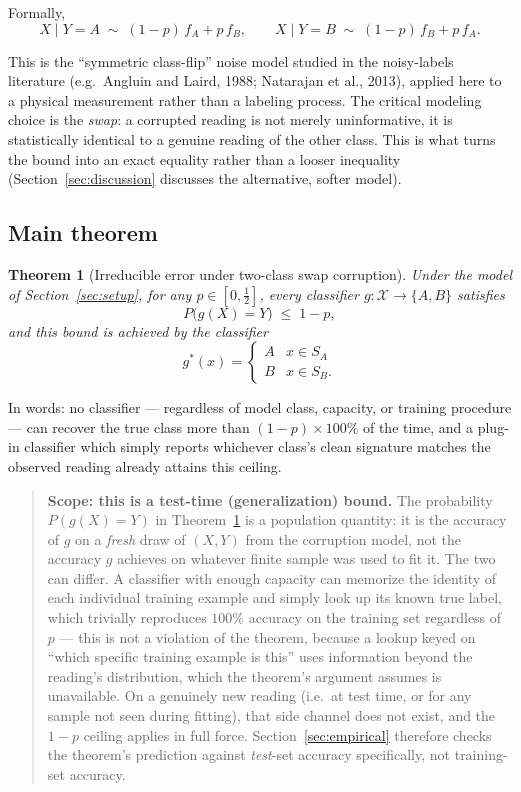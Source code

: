 \documentclass[11pt]{article}
\newtheorem{theorem}{Theorem}
\begin{document}
Formally,
\[
  X \mid Y = A \;\sim\; (1-p)\,f_A + p\,f_B,
  \qquad
  X \mid Y = B \;\sim\; (1-p)\,f_B + p\,f_A.
\]

This is the ``symmetric class-flip'' noise model studied in the
noisy-labels literature (e.g.\ Angluin and Laird, 1988; Natarajan et al.,
2013), applied here to a physical measurement rather than a labeling
process. The critical modeling choice is the \emph{swap}: a corrupted
reading is not merely uninformative, it is statistically identical to a
genuine reading of the other class. This is what turns the bound into an
exact equality rather than a looser inequality (Section~\ref{sec:discussion}
discusses the alternative, softer model).

\subsection{Main theorem}

\begin{theorem}[Irreducible error under two-class swap corruption]
\label{thm:main}
Under the model of Section~\ref{sec:setup}, for any $p \in [0, \tfrac12]$,
every classifier $g : \mathcal{X} \to \{A, B\}$ satisfies
\[
  P\big(g(X) = Y\big) \;\le\; 1 - p,
\]
and this bound is achieved by the classifier
\[
  g^\ast(x) = \begin{cases} A & x \in S_A \\ B & x \in S_B. \end{cases}
\]
\end{theorem}

In words: no classifier --- regardless of model class, capacity, or training
procedure --- can recover the true class more than $(1-p) \times 100\%$ of
the time, and a plug-in classifier which simply reports whichever class's
clean signature matches the observed reading already attains this ceiling.

\begin{quote}
\textbf{Scope: this is a test-time (generalization) bound.} The probability
$P(g(X)=Y)$ in Theorem~\ref{thm:main} is a population quantity: it is the
accuracy of $g$ on a \emph{fresh} draw of $(X,Y)$ from the corruption model,
not the accuracy $g$ achieves on whatever finite sample was used to fit it.
The two can differ. A classifier with enough capacity can memorize the
identity of each individual training example and simply look up its known
true label, which trivially reproduces $100\%$ accuracy on the training set
regardless of $p$ --- this is not a violation of the theorem, because a
lookup keyed on ``which specific training example is this'' uses
information beyond the reading's distribution, which the theorem's argument
assumes is unavailable. On a genuinely new reading (i.e.\ at test time, or
for any sample not seen during fitting), that side channel does not exist,
and the $1-p$ ceiling applies in full force. Section~\ref{sec:empirical}
therefore checks the theorem's prediction against \emph{test}-set accuracy
specifically, not training-set accuracy.
\end{quote}
\end{document}
